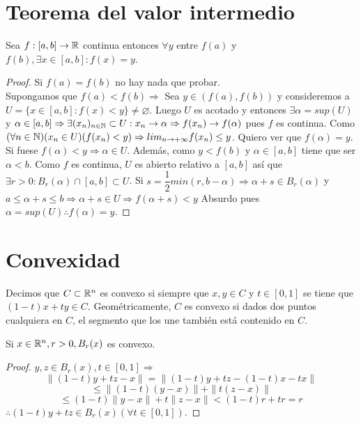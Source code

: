 \section{Teorema del valor intermedio}

\begin{theorem}
  Sea $f: [a, b] \to \mathbb{R}$ continua entonces $\forall y$ entre $f(a)$ y $f(b), \exists x \in [a, b] : f(x) = y$.

  \begin{proof}
    Si $f(a) = f(b)$ no hay nada que probar. \\
    Supongamos que $f(a) < f(b) \Rightarrow$ Sea $y \in (f(a), f(b))$ y consideremos a $U = \{ x \in [a, b] : f(x) < y \} \neq \varnothing$. Luego $U$ es acotado y entonces $\exists \alpha = sup(U)$ y $\alpha \in [a, b] \Rightarrow \exists (x_n)_{n \in \mathbb{N}} \subset U : x_n \to \alpha \Rightarrow f(x_n) \to f(\alpha)$ pues $f$ es continua. Como $(\forall n \in \mathbb{N})(x_n \in U)(f(x_n) < y) \Rightarrow lim_{n \to +\infty} f(x_n) \leq y$. Quiero ver que $f(\alpha) = y$. Si fuese $f(\alpha) < y \Rightarrow \alpha \in U$. Además, como $y < f(b)$ y $\alpha \in [a, b]$ tiene que ser $\alpha < b$. Como $f$ es continua, $U$ es abierto relativo a $[a, b]$ así que $\exists r > 0 : B_r(\alpha) \cap [a, b] \subset U$. Si $s = \dfrac{1}{2} min(r, b-\alpha) \Rightarrow \alpha + s \in B_r(\alpha)$ y $a \leq \alpha + s \leq b \Rightarrow \alpha + s \in U \Rightarrow f(\alpha + s) < y$ Absurdo pues $\alpha = sup(U) \therefore f(\alpha) = y$.
  \end{proof}
\end{theorem}

\section{Convexidad}

\begin{definition}[Convexidad]
  Decimos que $C \subset \mathbb{R}^n$ es convexo si siempre que $x, y \in C$ y $t \in [0, 1]$ se tiene que $(1-t)x+ty \in C$. Geométricamente, $C$ es convexo si dados dos puntos cualquiera en $C$, el segmento que los une también está contenido en $C$.
\end{definition}

\begin{eg}
  Si $x \in \mathbb{R}^n, r > 0, B_r(x)$ es convexo.
  \begin{proof}
    $y, z \in B_r(x), t \in [0,1] \Rightarrow$ \begin{equation} \|(1-t)y+tz - x\| = \| (1-t)y + tz - (1-t)x - tx \| \end{equation} \begin{equation} \leq \|(1 -t) (y-x) \| + \|t(z-x)\| \end{equation}
    \begin{equation} \leq (1-t) \|y-x\| + t \|z-x\| < (1-t)r + tr = r \end{equation} $\therefore (1-t)y + tz \in B_r(x) (\forall t \in [0, 1])$.
  \end{proof}
\end{eg}

